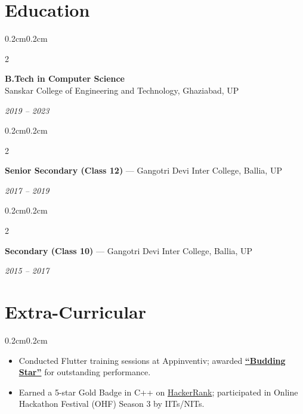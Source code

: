 \documentclass[10pt, letterpaper]{article}
\newenvironment{highlights}{\begin{itemize}[topsep=0.06cm, parsep=0.06cm, partopsep=0pt, itemsep=0pt, leftmargin=0.5cm]}{\end{itemize}}
\newenvironment{onecolentry}{\begin{adjustwidth}{0.2cm}{0.2cm}}{\end{adjustwidth}}
\newenvironment{twocolentry}[2][]{
  \onecolentry
  \def\secondColumn{#2}
  \setcolumnwidth{\fill, 4.5cm}
  \begin{paracol}{2}
}{
  \switchcolumn \raggedleft \secondColumn
  \end{paracol}
  \endonecolentry
}
\begin{document}
\section{Education}

\begin{twocolentry}{\textit{2019 – 2023}}
\textbf{B.Tech in Computer Science} \\
Sanskar College of Engineering and Technology, Ghaziabad, UP
\end{twocolentry}

\begin{twocolentry}{\textit{2017 – 2019}}
\textbf{Senior Secondary (Class 12)} — Gangotri Devi Inter College, Ballia, UP
\end{twocolentry}

\begin{twocolentry}{\textit{2015 – 2017}}
\textbf{Secondary (Class 10)} — Gangotri Devi Inter College, Ballia, UP
\end{twocolentry}


\section{Extra-Curricular}
\begin{onecolentry}
\begin{highlights}
    \item Conducted Flutter training sessions at Appinventiv; awarded \href{https://www.linkedin.com/posts/ashish-rai-0a4983207_appinventiv-flutterdeveloper-teamwo-activity-7288898325699866624-NAKb?utm_source=share&utm_medium=member_desktop&rcm=ACoAADSluLwBBibsxF-PRP1IjH2pAnTAcoxdwYg}{\textbf{“Budding Star”}} for outstanding performance.
    \item Earned a 5-star Gold Badge in C++ on \href{https://www.hackerrank.com/profile/ashishraimse}{HackerRank}; participated in Online Hackathon Festival (OHF) Season 3 by IITs/NITs.
\end{highlights}
\end{onecolentry}
\end{document}
